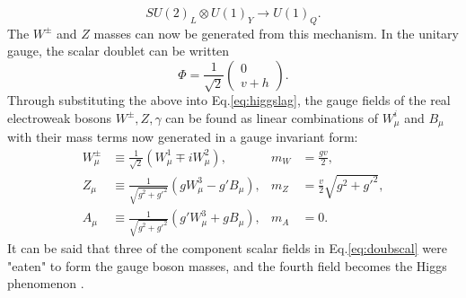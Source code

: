 \documentclass[a4paper,12pt]{article}
\begin{document}
\begin{equation}
    \label{eq:symbreak}
    SU(2)_L\otimes U(1)_Y \to U(1)_Q.
\end{equation}
The $W^\pm$ and $Z$ masses can now be generated from this mechanism. 
In the unitary gauge, the scalar doublet can be written
\begin{equation}
    \label{eq:unig}
    \Phi = \frac{1}{\sqrt{2}}\begin{pmatrix}0\\v+h\end{pmatrix}.
\end{equation}
Through substituting the above into Eq.\eqref{eq:higgslag}, the gauge fields of the real electroweak bosons $W^{\pm},Z,\gamma$ can be found as linear combinations of $W^i_\mu$ and $B_\mu$ with their mass terms now generated in a gauge invariant form:
\begin{align}
    \label{eq:gagmix}
    W^\pm_\mu &\equiv \frac{1}{\sqrt{2}}(W_\mu^1 \mp iW_\mu^2), & m_W &= \frac{gv}{2}, \\
    Z_\mu &\equiv \frac{1}{\sqrt{g^2+g'^2}}(gW^3_\mu-g'B_\mu), & m_Z &= \frac{v}{2}\sqrt{g^2+g'^2},\\
    A_\mu &\equiv \frac{1}{\sqrt{g^2+g'^2}}(g'W_\mu^3+gB_\mu), & m_A &= 0.
\end{align}
It can be said that three of the component scalar fields in Eq.\eqref{eq:doubscal} were "eaten" to form the gauge boson masses, and the fourth field becomes the Higgs phenomenon \cite{schwartz}.
\end{document}
